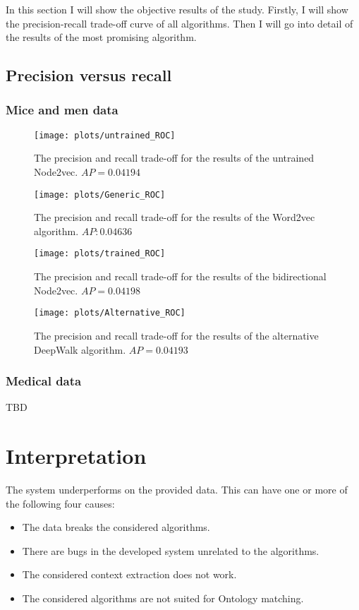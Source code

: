 \documentclass{article}
\begin{document}
 In this section I will show the objective results of the study. Firstly, I will show the precision-recall trade-off curve of all algorithms. Then I will go into detail of the results of the most promising algorithm.
 
 \subsection{Precision versus recall}
  \subsubsection{Mice and men data}
  \begin{figure}[H]
   \centering
   \texttt{[image: plots/untrained\_ROC]}
   \caption{The precision and recall trade-off for the results of the untrained Node2vec. $AP = 0.04194$}
   \label{ROC_trained}
  \end{figure}
 
  \begin{figure}[H]
   \centering
   \texttt{[image: plots/Generic\_ROC]}
   \caption{The precision and recall trade-off for the results of the Word2vec algorithm. $AP: 0.04636$}
   \label{ROC_trained}
  \end{figure}
 
  \begin{figure}[H]
   \centering
   \texttt{[image: plots/trained\_ROC]}
   \caption{The precision and recall trade-off for the results of the bidirectional Node2vec. $AP = 0.04198$}
   \label{ROC_trained}
  \end{figure}
  
  \begin{figure}[H]
   \centering
   \texttt{[image: plots/Alternative\_ROC]}
   \caption{The precision and recall trade-off for the results of the alternative DeepWalk algorithm. $AP = 0.04193$}
   \label{ROC_trained}
  \end{figure}
   \subsubsection{Medical data}
   TBD
   
 \newpage
 \section{Interpretation}
  The system underperforms on the provided data. This can have one or more of the following four causes:
  \begin{itemize}
  \item The data breaks the considered algorithms.
  \item There are bugs in the developed system unrelated to the algorithms.
  \item The considered context extraction does not work.
  \item The considered algorithms are not suited for Ontology matching.
  \end{itemize}
  
\end{document}
